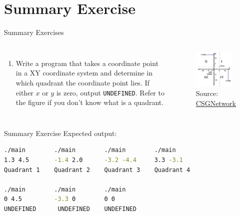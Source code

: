 \documentclass[10pt,xcolor={table,dvipsnames},t]{beamer}
\begin{document}
\section{Summary Exercise}
\begin{frame}[fragile]{Summary Exercises}
  \begin{columns}
    \begin{enumerate}
      \setcounter{enumi}{0}
      \item Write a program that takes a coordinate point in a XY coordinate system and determine in which quadrant the coordinate point lies. If either $x$ or $y$ is zero, output \texttt{UNDEFINED}. Refer to the figure if you don't know what is a quadrant.
    \end{enumerate}
    \begin{figure}
      \includegraphics[width=0.9\textwidth]{img/quadrant.jpg}
      \caption*{Source: \href{http://www.csgnetwork.com/coordinatedistancecalc.html}{CSGNetwork}}
    \end{figure}
  \end{columns}
\end{frame}

\begin{frame}[fragile]{Summary Exercise}
Expected output:
\begin{lstlisting}[language=bash]
./main        ./main        ./main        ./main
1.3 4.5       -1.4 2.0      -3.2 -4.4     3.3 -3.1
Quadrant 1    Quadrant 2    Quadrant 3    Quadrant 4

./main        ./main        ./main        
0 4.5         -3.3 0        0 0     
UNDEFINED      UNDEFINED    UNDEFINED
\end{lstlisting}
\end{frame}
\end{document}
